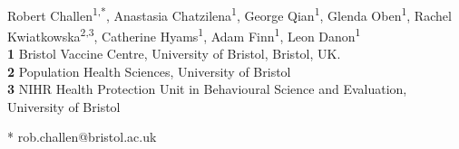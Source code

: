 \documentclass[10pt,letterpaper]{article}
\begin{document}
\vspace*{0.2in}

\begin{flushleft}
{\Large
\textbf{} %
}
\newline
\\
Robert Challen\textsuperscript{1,*},
Anastasia Chatzilena\textsuperscript{1},
George Qian\textsuperscript{1},
Glenda Oben\textsuperscript{1},
Rachel Kwiatkowska\textsuperscript{2,3},
Catherine Hyams\textsuperscript{1},
Adam Finn\textsuperscript{1},
Leon Danon\textsuperscript{1}
\\
\bigskip
\textbf{1} Bristol Vaccine Centre, University of Bristol, Bristol, UK.\\
\textbf{2} Population Health Sciences, University of Bristol\\
\textbf{3} NIHR Health Protection Unit in Behavioural Science and Evaluation, University of Bristol\\
\bigskip

%
%





* rob.challen@bristol.ac.uk

\end{flushleft}
\end{document}
